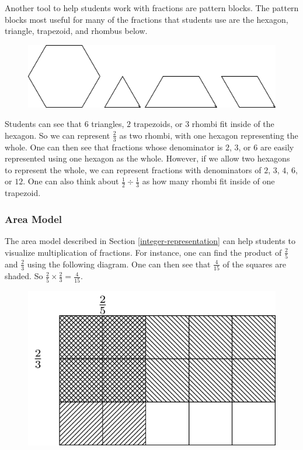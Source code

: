 \documentclass[
]{book}
\theoremstyle{definition}
\theoremstyle{definition}
\theoremstyle{definition}
\theoremstyle{definition}
\theoremstyle{remark}
\begin{document}
Another tool to help students work with fractions are pattern blocks. The pattern blocks most useful for many of the fractions that students use are the hexagon, triangle, trapezoid, and rhombus below.

\begin{figure}

{\centering \includegraphics[width=0.6\linewidth]{tikz/pattern-blocks} 

}

\end{figure}

Students can see that \(6\) triangles, \(2\) trapezoids, or \(3\) rhombi fit inside of the hexagon. So we can represent \(\frac{2}{3}\) as two rhombi, with one hexagon representing the whole. One can then see that fractions whose denominator is \(2\), \(3\), or \(6\) are easily represented using one hexagon as the whole. However, if we allow two hexagons to represent the whole, we can represent fractions with denominators of \(2\), \(3\), \(4\), \(6\), or \(12\). One can also think about \(\frac{1}{2} \div \frac{1}{3}\) as how many rhombi fit inside of one trapezoid.

\hypertarget{area-model-1}{%
\subsubsection{Area Model}\label{area-model-1}}

The area model described in Section \ref{integer-representation} can help students to visualize multiplication of fractions. For instance, one can find the product of \(\frac{2}{5}\) and \(\frac{2}{3}\) using the following diagram. One can then see that \(\frac{4}{15}\) of the squares are shaded. So \(\frac{2}{5} \times \frac{2}{3} = \frac{4}{15}\).

\begin{figure}

{\centering \includegraphics[width=0.6\linewidth]{tikz/area-model-fractions} 

}

\end{figure}
\end{document}
